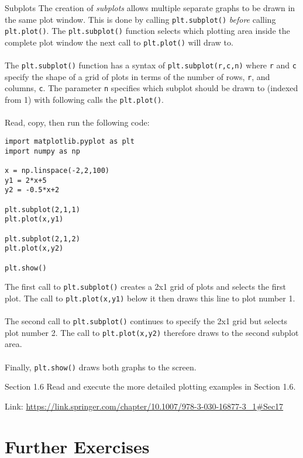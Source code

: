 \documentclass{lab}
\begin{document}
\begin{task}{Subplots}{}
The creation of \textit{subplots} allows multiple separate graphs to be drawn in the same plot window. This is done by calling \texttt{plt.subplot()} \textit{before} calling \texttt{plt.plot()}. The \texttt{plt.subplot()} function selects which plotting area inside the complete plot window the next call to \texttt{plt.plot()} will draw to.
\\~\\
The \texttt{plt.subplot()} function has a syntax of \texttt{plt.subplot(r,c,n)} where \texttt{r} and \texttt{c} specify the shape of a grid of plots in terms of the number of rows, \texttt{r}, and columns, \texttt{c}. The parameter \texttt{n} specifies which subplot should be drawn to (indexed from 1) with following calls the \texttt{plt.plot()}.
\\~\\
Read, copy, then run the following code:
\begin{lstlisting}
import matplotlib.pyplot as plt
import numpy as np

x = np.linspace(-2,2,100)
y1 = 2*x+5
y2 = -0.5*x+2

plt.subplot(2,1,1)
plt.plot(x,y1)

plt.subplot(2,1,2)
plt.plot(x,y2)

plt.show()
\end{lstlisting}
The first call to \texttt{plt.subplot()} creates a 2x1 grid of plots and selects the first plot. The call to \texttt{plt.plot(x,y1)} below it then draws this line to plot number 1.
\\~\\
The second call to \texttt{plt.subplot()} continues to specify the 2x1 grid but selects plot number 2. The call to \texttt{plt.plot(x,y2)} therefore draws to the second subplot area.
\\~\\
Finally, \texttt{plt.show()} draws both graphs to the screen.
\end{task}

\begin{task}{Section 1.6}{}
Read and execute the more detailed plotting examples in Section 1.6.

Link: \url{https://link.springer.com/chapter/10.1007/978-3-030-16877-3_1#Sec17}
\end{task}

\pagebreak
\section{Further Exercises}
\end{document}
